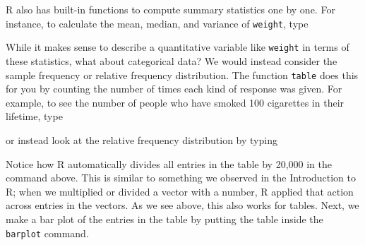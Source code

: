 \documentclass[]{book}
\newenvironment{Shaded}{\begin{snugshade}}{\end{snugshade}}
\newcommand{\KeywordTok}[1]{\textcolor[rgb]{0.13,0.29,0.53}{\textbf{{#1}}}}
\newcommand{\DecValTok}[1]{\textcolor[rgb]{0.00,0.00,0.81}{{#1}}}
\newcommand{\NormalTok}[1]{{#1}}
\theoremstyle{definition}
\theoremstyle{definition}
\theoremstyle{definition}
\theoremstyle{remark}
\begin{document}
R also has built-in functions to compute summary statistics one by one.
For instance, to calculate the mean, median, and variance of
\texttt{weight}, type

\begin{Shaded}
\end{Shaded}

While it makes sense to describe a quantitative variable like
\texttt{weight} in terms of these statistics, what about categorical
data? We would instead consider the sample frequency or relative
frequency distribution. The function \texttt{table} does this for you by
counting the number of times each kind of response was given. For
example, to see the number of people who have smoked 100 cigarettes in
their lifetime, type

\begin{Shaded}
\end{Shaded}

or instead look at the relative frequency distribution by typing

\begin{Shaded}
\end{Shaded}

Notice how R automatically divides all entries in the table by 20,000 in
the command above. This is similar to something we observed in the
Introduction to R; when we multiplied or divided a vector with a number,
R applied that action across entries in the vectors. As we see above,
this also works for tables. Next, we make a bar plot of the entries in
the table by putting the table inside the \texttt{barplot} command.

\begin{Shaded}
\end{Shaded}
\end{document}
